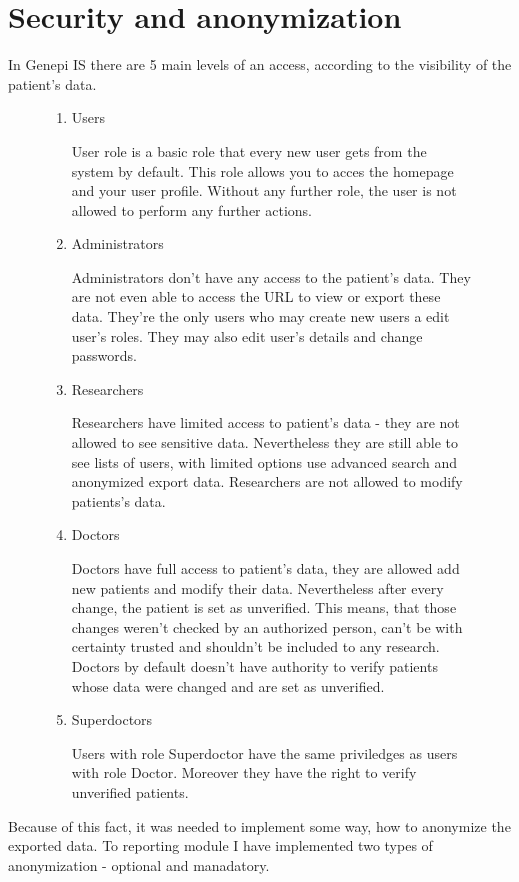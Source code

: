 \documentclass[thesis=B,english]{FITthesis}[2012/10/20]
\begin{document}
\section{Security and anonymization}
In Genepi IS there are 5 main levels of an access, according to the visibility of the patient's data.
\begin{figure}[ht]
	\begin{enumerate}
	\item{Users}
	
	User role is a basic role that every new user gets from the system by default. This role allows you to acces the homepage 	and your user profile. Without any further role, the user is not allowed to perform any further actions.

	\item{Administrators}

	Administrators don't have any access to the patient's data. They are not even able to access the URL to view or export 			these data. They're the only users who may create new users a edit user's roles. They may also edit user's details and change passwords.
	\item{Researchers}

	Researchers have limited access to patient's data - they are not allowed to see sensitive data. Nevertheless they are 			still able to see lists of users, with limited options use advanced search and anonymized export data. Researchers are 			not allowed to modify patients's data.
	\item{Doctors}

	Doctors have full access to patient's data, they are allowed add new patients and modify their data. Nevertheless after every change, the patient is set as unverified. This means, that those changes weren't checked by an authorized person, can't be with certainty trusted and shouldn't be included to any research. Doctors by default doesn't have authority to verify patients whose data were changed and are set as unverified.

	\item{Superdoctors}

	Users with role Superdoctor have the same priviledges as users with role Doctor. Moreover they have the right to verify 		unverified patients.

	\end{enumerate}
\end{figure}

Because of this fact, it was needed to implement some way, how to anonymize the exported data. To reporting module I have implemented two types of anonymization - optional and manadatory.
\end{document}
